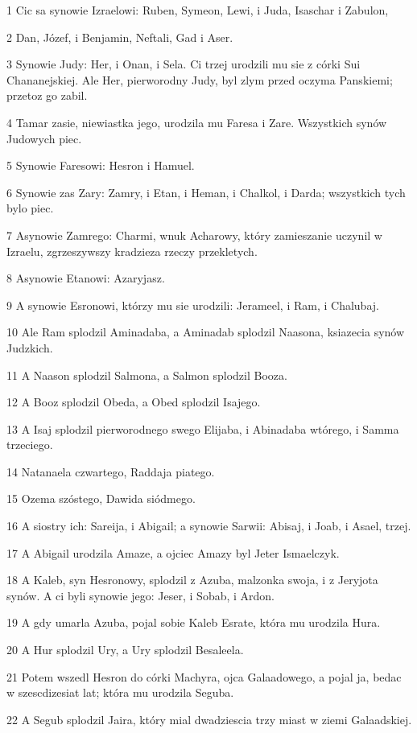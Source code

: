 \par 1 Cic sa synowie Izraelowi: Ruben, Symeon, Lewi, i Juda, Isaschar i Zabulon,
\par 2 Dan, Józef, i Benjamin, Neftali, Gad i Aser.
\par 3 Synowie Judy: Her, i Onan, i Sela. Ci trzej urodzili mu sie z córki Sui Chananejskiej. Ale Her, pierworodny Judy, byl zlym przed oczyma Panskiemi; przetoz go zabil.
\par 4 Tamar zasie, niewiastka jego, urodzila mu Faresa i Zare. Wszystkich synów Judowych piec.
\par 5 Synowie Faresowi: Hesron i Hamuel.
\par 6 Synowie zas Zary: Zamry, i Etan, i Heman, i Chalkol, i Darda; wszystkich tych bylo piec.
\par 7 Asynowie Zamrego: Charmi, wnuk Acharowy, który zamieszanie uczynil w Izraelu, zgrzeszywszy kradzieza rzeczy przekletych.
\par 8 Asynowie Etanowi: Azaryjasz.
\par 9 A synowie Esronowi, którzy mu sie urodzili: Jerameel, i Ram, i Chalubaj.
\par 10 Ale Ram splodzil Aminadaba, a Aminadab splodzil Naasona, ksiazecia synów Judzkich.
\par 11 A Naason splodzil Salmona, a Salmon splodzil Booza.
\par 12 A Booz splodzil Obeda, a Obed splodzil Isajego.
\par 13 A Isaj splodzil pierworodnego swego Elijaba, i Abinadaba wtórego, i Samma trzeciego.
\par 14 Natanaela czwartego, Raddaja piatego.
\par 15 Ozema szóstego, Dawida siódmego.
\par 16 A siostry ich: Sareija, i Abigail; a synowie Sarwii: Abisaj, i Joab, i Asael, trzej.
\par 17 A Abigail urodzila Amaze, a ojciec Amazy byl Jeter Ismaelczyk.
\par 18 A Kaleb, syn Hesronowy, splodzil z Azuba, malzonka swoja, i z Jeryjota synów. A ci byli synowie jego: Jeser, i Sobab, i Ardon.
\par 19 A gdy umarla Azuba, pojal sobie Kaleb Esrate, która mu urodzila Hura.
\par 20 A Hur splodzil Ury, a Ury splodzil Besaleela.
\par 21 Potem wszedl Hesron do córki Machyra, ojca Galaadowego, a pojal ja, bedac w szescdizesiat lat; która mu urodzila Seguba.
\par 22 A Segub splodzil Jaira, który mial dwadziescia trzy miast w ziemi Galaadskiej.
